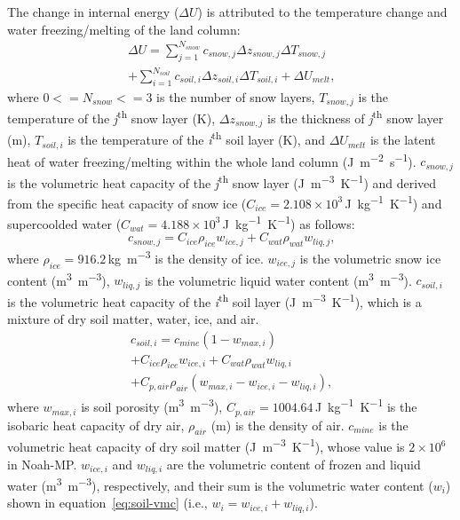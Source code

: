 \documentclass[essd]{copernicus}
\begin{document}
The change in internal energy (\(\Delta U\)) is attributed to the temperature
change and water freezing/melting of the land column:
\begin{multline}
  \Delta U = \sum_{j=1}^{N_{snow}} c_{snow,j}
  \Delta z_{snow,j} \Delta T_{snow,j} \\
  + \sum_{i=1}^{N_{soil}} c_{soil,i} \Delta z_{soil,i} \Delta T_{soil,i}
  + \Delta U_{melt} \text{,}
\end{multline}
where \(0<=N_{snow}<=3\) is the number of snow layers, \(T_{snow,j}\) is the
temperature of the \textit{j}\textsuperscript{th} snow layer (K), \(\Delta
z_{snow,j}\) is the thickness of \textit{j}\textsuperscript{th} snow layer (m),
\(T_{soil,i}\) is the temperature of the \textit{i}\textsuperscript{th} soil
layer (K), and \(\Delta U_{melt}\) is the latent heat of water freezing/melting
within the whole land column (\si{J~m^{-2}~s^{-1}}). \(c_{snow,j}\) is the
volumetric heat capacity of the \textit{j}\textsuperscript{th} snow layer
(\si{J~m^{-3}~K^{-1}}) and derived from the specific heat capacity of snow ice
(\(C_{ice} = 2.108 \times 10^3\)\,\si{J~kg^{-1}~K^{-1}}) and supercoolded water
(\(C_{wat} = 4.188 \times 10^3\)\,\si{J~kg^{-1}~K^{-1}}) as follows:
\begin{equation}
  c_{snow,j} = C_{ice} \rho_{ice} w_{ice,j}
  + C_{wat} \rho_{wat} w_{liq,j} \text{,}
\end{equation}
where \(\rho_{ice} = 916.2\)\,\si{kg~m^{-3}} is the density of ice. $w_{ice,j}$
is the volumetric snow ice content (\si{m^3~m^{-3}}), \(w_{liq,j}\) is the
volumetric liquid water content (\si{m^3~m^{-3}}). \(c_{soil,i}\) is the
volumetric heat capacity of the \textit{i}\textsuperscript{th} soil layer
(\si{J~m^{-3}~K^{-1}}), which is a mixture of dry soil matter, water, ice, and
air.
\begin{multline}
  c_{soil,i} = c_{mine} (1 - w_{max,i}) \\
  + C_{ice} \rho_{ice} w_{ice,i} + C_{wat} \rho_{wat} w_{liq,i} \\
  + C_{p,air} \rho_{air} (w_{max,i} - w_{ice,i} - w_{liq,i}) \text{,}
\end{multline}
where \(w_{max,i}\) is soil porosity (\si{m^3~m^{-3}}), $C_{p,air} =
1004.64$\,\si{J~kg^{-1}~K^{-1}} is the isobaric heat capacity of dry air,
\(\rho_{air}\) (\si{m}) is the density of air. \(c_{mine}\) is the volumetric
heat capacity of dry soil matter (\si{J~m^{-3}~K^{-1}}), whose value is
\(2\times10^6\) in Noah-MP. \(w_{ice,i}\) and \(w_{liq,i}\) are the volumetric
content of frozen and liquid water (\si{m^3~m^{-3}}), respectively, and their
sum is the volumetric water content (\(w_{i}\)) shown in
equation~\eqref{eq:soil-vmc} (i.e., \(w_{i} = w_{ice,i} + w_{liq,i}\)).
\end{document}
